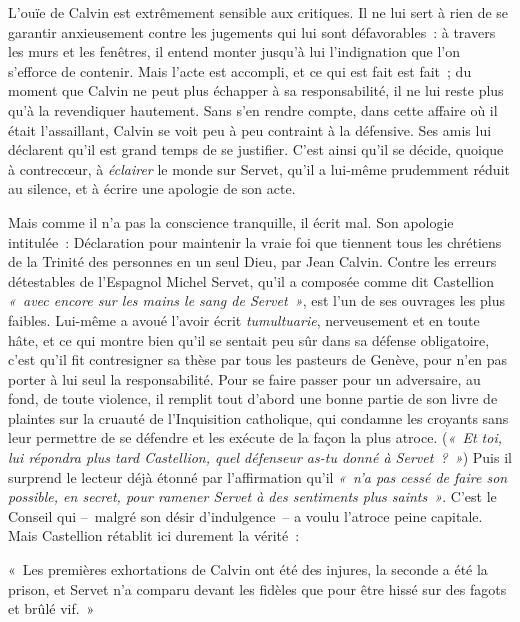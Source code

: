 \documentclass[french,twoside]{book} %
\newenvironment{quoteblock}%
  {\begin{quoting}}
  {\end{quoting}}
\newenvironment{quotebar}{%
    \def\FrameCommand{{\color{rubric!10!}\vrule width 0.5em} \hspace{0.9em}}%
    \def\OuterFrameSep{2pt} %
    \MakeFramed {\advance\hsize-\width \FrameRestore}
  }%
  {%
    \endMakeFramed
  }
\renewenvironment{quoteblock}%
  {%
    \savenotes
    \setstretch{0.9}
    \normalfont
    \begin{quotebar}
  }
  {%
    \end{quotebar}
    \spewnotes
  }
\begin{document}
\noindent L’ouïe de Calvin est extrêmement sensible aux critiques. Il ne lui sert à rien de se garantir anxieusement contre les jugements qui lui sont défavorables : à travers les murs et les fenêtres, il entend monter jusqu’à lui l’indignation que l’on s’efforce de contenir. Mais l’acte est accompli, et ce qui est fait est fait ; du moment que Calvin ne peut plus échapper à sa responsabilité, il ne lui reste plus qu’à la revendiquer hautement. Sans s’en rendre compte, dans cette affaire où il était l’assaillant, Calvin se voit peu à peu contraint à la défensive. Ses amis lui déclarent qu’il est grand temps de se justifier. C’est ainsi qu’il se décide, quoique à contrecœur, à \emph{éclairer} le monde sur Servet, qu’il a lui-même prudemment réduit au silence, et à écrire une apologie de son acte.\par
Mais comme il n’a pas la conscience tranquille, il écrit mal. Son apologie intitulée : Déclaration pour maintenir la vraie foi que tiennent tous les chrétiens de la Trinité des personnes en un seul Dieu, par Jean Calvin. Contre les erreurs détestables de l’Espagnol Michel Servet, qu’il a composée comme dit Castellion \emph{« avec encore sur les mains le sang de Servet »}, est l’un de ses ouvrages les plus faibles. Lui-même a avoué l’avoir écrit \emph{tumultuarie}, nerveusement et en toute hâte, et ce qui montre bien qu’il se sentait peu sûr dans sa défense obligatoire, c’est qu’il fit contresigner sa thèse par tous les pasteurs de Genève, pour n’en pas porter à lui seul la responsabilité. Pour se faire passer pour un adversaire, au fond, de toute violence, il remplit tout d’abord une bonne partie de son livre de plaintes sur la cruauté de l’Inquisition catholique, qui condamne les croyants sans leur permettre de se défendre et les exécute de la façon la plus atroce. (\emph{« Et toi, lui répondra plus tard Castellion, quel défenseur as-tu donné à Servet ? »}) Puis il surprend le lecteur déjà étonné par l’affirmation qu’il \emph{« n’a pas cessé de faire son possible, en secret, pour ramener Servet à des sentiments plus saints »}. C’est le Conseil qui – malgré son désir d’indulgence – a voulu l’atroce peine capitale. Mais Castellion rétablit ici durement la vérité :\par

\begin{quoteblock}
\noindent « Les premières exhortations de Calvin ont été des injures, la seconde a été la prison, et Servet n’a comparu devant les fidèles que pour être hissé sur des fagots et brûlé vif. »\end{quoteblock}
\end{document}
